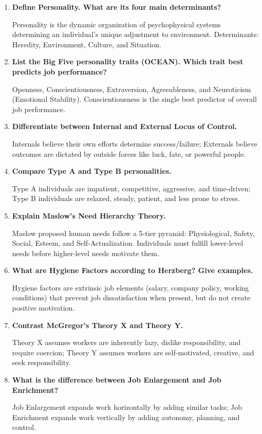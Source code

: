 \documentclass[12pt,a4paper]{article}
\newcommand{\Q}[1]{\textbf{#1}\par\noindent\ignorespaces}
\begin{document}
\begin{tcolorbox}[exambox, title={\textbf{Frequently Asked / Viva Questions}}]
\begin{enumerate}[leftmargin=*, itemsep=4pt]
  \item \Q{Define Personality. What are its four main determinants?}
    Personality is the dynamic organization of psychophysical systems determining an individual's unique adjustment to environment. Determinants: Heredity, Environment, Culture, and Situation.
  
  \item \Q{List the Big Five personality traits (OCEAN). Which trait best predicts job performance?}
    Openness, Conscientiousness, Extraversion, Agreeableness, and Neuroticism (Emotional Stability). Conscientiousness is the single best predictor of overall job performance.
  
  \item \Q{Differentiate between Internal and External Locus of Control.}
    Internals believe their own efforts determine success/failure; Externals believe outcomes are dictated by outside forces like luck, fate, or powerful people.
  
  \item \Q{Compare Type A and Type B personalities.}
    Type A individuals are impatient, competitive, aggressive, and time-driven; Type B individuals are relaxed, steady, patient, and less prone to stress.
  
  \item \Q{Explain Maslow's Need Hierarchy Theory.}
    Maslow proposed human needs follow a 5-tier pyramid: Physiological, Safety, Social, Esteem, and Self-Actualization. Individuals must fulfill lower-level needs before higher-level needs motivate them.
  
  \item \Q{What are Hygiene Factors according to Herzberg? Give examples.}
    Hygiene factors are extrinsic job elements (salary, company policy, working conditions) that prevent job dissatisfaction when present, but do not create positive motivation.
  
  \item \Q{Contrast McGregor's Theory X and Theory Y.}
    Theory X assumes workers are inherently lazy, dislike responsibility, and require coercion; Theory Y assumes workers are self-motivated, creative, and seek responsibility.
  
  \item \Q{What is the difference between Job Enlargement and Job Enrichment?}
    Job Enlargement expands work horizontally by adding similar tasks; Job Enrichment expands work vertically by adding autonomy, planning, and control.
  

\end{enumerate}
\end{tcolorbox}
\end{document}
